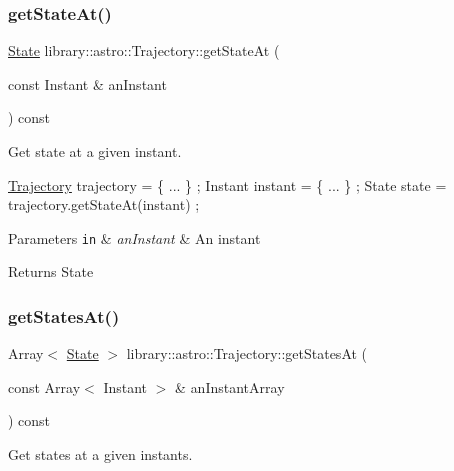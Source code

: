 \subsubsection{\texorpdfstring{get\+State\+At()}{getStateAt()}}
{\footnotesize\ttfamily \hyperlink{classlibrary_1_1astro_1_1trajectory_1_1_state}{State} library\+::astro\+::\+Trajectory\+::get\+State\+At (\begin{DoxyParamCaption}\item[{const Instant \&}]{an\+Instant }\end{DoxyParamCaption}) const}



Get state at a given instant. 


\begin{DoxyCode}
\hyperlink{classlibrary_1_1astro_1_1_trajectory_a8e5c7740915ca947e067c0f419ac1c65}{Trajectory} trajectory = \{ ... \} ;
Instant instant = \{ ... \} ;
State state = trajectory.getStateAt(instant) ;
\end{DoxyCode}



\begin{DoxyParams}[1]{Parameters}
\mbox{\tt in}  & {\em an\+Instant} & An instant \\
\hline
\end{DoxyParams}
\begin{DoxyReturn}{Returns}
State 
\end{DoxyReturn}
\mbox{\label{classlibrary_1_1astro_1_1_trajectory_a0b7d9ed6012f968b1bfde1f2cc4e34f5}} 
\subsubsection{\texorpdfstring{get\+States\+At()}{getStatesAt()}}
{\footnotesize\ttfamily Array$<$ \hyperlink{classlibrary_1_1astro_1_1trajectory_1_1_state}{State} $>$ library\+::astro\+::\+Trajectory\+::get\+States\+At (\begin{DoxyParamCaption}\item[{const Array$<$ Instant $>$ \&}]{an\+Instant\+Array }\end{DoxyParamCaption}) const}



Get states at a given instants. 



